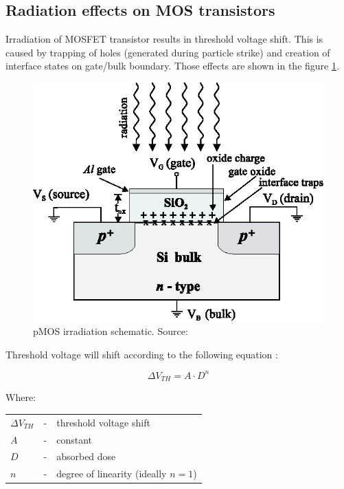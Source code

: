     \subsection{Radiation effects on MOS transistors}
    \label{Radiation_effects_on_MOS_transistors}
        Irradiation of MOSFET transistor results in threshold voltage shift. This is caused by trapping of holes (generated during particle strike) and creation of interface states on gate/bulk boundary. Those effects are shown in the figure \ref{MOS_irradiation}.

        \begin{figure}[H]
            \centering
            \includegraphics[width=0.65\paperwidth]{img/03/MOS_irradiation_schematic.eps}
            \caption{pMOS irradiation schematic. Source: \cite{pMOS_dosimeters_radfets}}
            \label{MOS_irradiation}
        \end{figure}

        Threshold voltage will shift according to the following equation \cite{pMOS_dosimeters_radfets}:

        $$\Delta V_{TH} = A \cdot D^n$$

        Where:

        \begin{tabular}{lcl}
            $\Delta V_{TH}$ & - & threshold voltage shift \\
            $A$ & - & constant \\
            $D$ & - & absorbed dose \\
            $n$ & - & degree of linearity (ideally $n = 1$) \\
        \end{tabular}
        \bigskip

